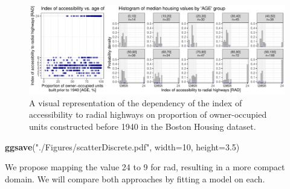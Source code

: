 \documentclass[
]{article}
\newenvironment{Shaded}{\begin{snugshade}}{\end{snugshade}}
\newcommand{\AttributeTok}[1]{\textcolor[rgb]{0.13,0.29,0.53}{#1}}
\newcommand{\DecValTok}[1]{\textcolor[rgb]{0.00,0.00,0.81}{#1}}
\newcommand{\FloatTok}[1]{\textcolor[rgb]{0.00,0.00,0.81}{#1}}
\newcommand{\FunctionTok}[1]{\textcolor[rgb]{0.13,0.29,0.53}{\textbf{#1}}}
\newcommand{\NormalTok}[1]{#1}
\newcommand{\StringTok}[1]{\textcolor[rgb]{0.31,0.60,0.02}{#1}}
\begin{document}
\begin{figure}[H]

{\centering \includegraphics{IntroductionSLGP_files/figure-latex/figureHousingDiscrete-1} 

}

\caption{A visual representation of the dependency of the index of accessibility to radial highways on proportion of owner-occupied units constructed before 1940 in the Boston Housing dataset.}\label{fig:figureHousingDiscrete}
\end{figure}

\begin{Shaded}
\begin{Highlighting}[]
\FunctionTok{ggsave}\NormalTok{(}\StringTok{"./Figures/scatterDiscrete.pdf"}\NormalTok{, }\AttributeTok{width=}\DecValTok{10}\NormalTok{, }\AttributeTok{height=}\FloatTok{3.5}\NormalTok{)}
\end{Highlighting}
\end{Shaded}

We propose mapping the value 24 to 9 for rad, resulting in a more compact domain. We will compare both approaches by fitting a model on each.
\end{document}
